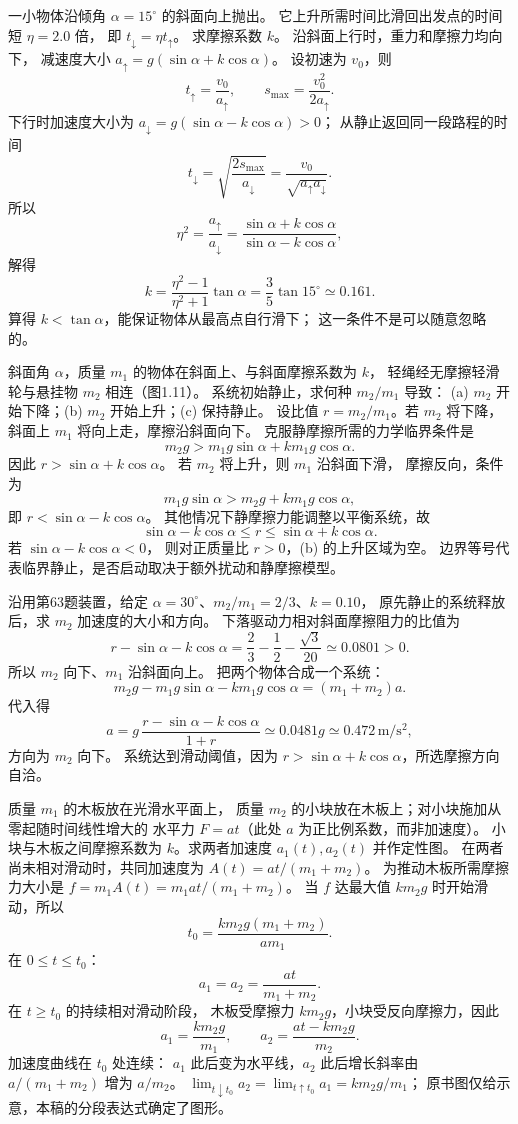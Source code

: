 一小物体沿倾角 $\alpha=15^\circ$ 的斜面向上抛出。
它上升所需时间比滑回出发点的时间短 $\eta=2.0$ 倍，
即 $t_{\downarrow}=\eta t_{\uparrow}$。
求摩擦系数 $k$。
\exsolution
沿斜面上行时，重力和摩擦力均向下，
减速度大小
$a_\uparrow=g(\sin\alpha+k\cos\alpha)$。
设初速为 $v_0$，则
\[
 t_\uparrow=\frac{v_0}{a_\uparrow},\qquad
 s_{\max}=\frac{v_0^2}{2a_\uparrow}.
\]
下行时加速度大小为
$a_\downarrow=g(\sin\alpha-k\cos\alpha)>0$；
从静止返回同一段路程的时间
\[
 t_\downarrow=\sqrt{\frac{2s_{\max}}{a_\downarrow}}
 =\frac{v_0}{\sqrt{a_\uparrow a_\downarrow}}.
\]
所以
\[
 \eta^2=\frac{a_\uparrow}{a_\downarrow}
 =\frac{\sin\alpha+k\cos\alpha}
 {\sin\alpha-k\cos\alpha},
\]
解得
\[
 \boxed{k=\frac{\eta^2-1}{\eta^2+1}\tan\alpha
 =\frac35\tan15^\circ\simeq0.161.}
\]
\excheck 算得 $k<\tan\alpha$，能保证物体从最高点自行滑下；
这一条件不是可以随意忽略的。

斜面角 $\alpha$，质量 $m_1$ 的物体在斜面上、与斜面摩擦系数为 $k$，
轻绳经无摩擦轻滑轮与悬挂物 $m_2$ 相连（图1.11）。
系统初始静止，求何种 $m_2/m_1$ 导致：
(a) $m_2$ 开始下降；(b) $m_2$ 开始上升；(c) 保持静止。
\exsolution
设比值 $r=m_2/m_1$。若 $m_2$ 将下降，
斜面上 $m_1$ 将向上走，摩擦沿斜面向下。
克服静摩擦所需的力学临界条件是
\[
 m_2g>m_1g\sin\alpha+km_1g\cos\alpha.
\]
因此
$\boxed{r>\sin\alpha+k\cos\alpha}$。
若 $m_2$ 将上升，则 $m_1$ 沿斜面下滑，
摩擦反向，条件为
\[
 m_1g\sin\alpha>m_2g+km_1g\cos\alpha,
\]
即 $\boxed{r<\sin\alpha-k\cos\alpha}$。
其他情况下静摩擦力能调整以平衡系统，故
\[
 \boxed{\sin\alpha-k\cos\alpha
 \le r\le \sin\alpha+k\cos\alpha.}
\]
\excheck 若 $\sin\alpha-k\cos\alpha<0$，
则对正质量比 $r>0$，(b) 的上升区域为空。
边界等号代表临界静止，是否启动取决于额外扰动和静摩擦模型。

沿用第63题装置，给定
$\alpha=30^\circ$、$m_2/m_1=2/3$、$k=0.10$，
原先静止的系统释放后，求 $m_2$ 加速度的大小和方向。
\exsolution
下落驱动力相对斜面摩擦阻力的比值为
\[
 r-\sin\alpha-k\cos\alpha
 =\frac23-\frac12-\frac{\sqrt3}{20}
 \simeq0.0801>0.
\]
所以 $m_2$ 向下、$m_1$ 沿斜面向上。
把两个物体合成一个系统：
\[
 m_2g-m_1g\sin\alpha-km_1g\cos\alpha
 =(m_1+m_2)a.
\]
代入得
\[
 \boxed{a=g\,\frac{r-\sin\alpha-k\cos\alpha}{1+r}
 \simeq0.0481g\simeq0.472\,\mathrm{m/s^2},}
\]
方向为 $m_2$ 向下。
\excheck 系统达到滑动阈值，因为
$r>\sin\alpha+k\cos\alpha$，所选摩擦方向自洽。

质量 $m_1$ 的木板放在光滑水平面上，
质量 $m_2$ 的小块放在木板上；对小块施加从零起随时间线性增大的
水平力 $F=at$（此处 $a$ 为正比例系数，而非加速度）。
小块与木板之间摩擦系数为 $k$。求两者加速度
$a_1(t),a_2(t)$ 并作定性图。
\exsolution
在两者尚未相对滑动时，共同加速度为
$A(t)=at/(m_1+m_2)$。
为推动木板所需摩擦力大小是
$f=m_1A(t)=m_1at/(m_1+m_2)$。
当 $f$ 达最大值 $km_2g$ 时开始滑动，所以
\[
 \boxed{t_0=\frac{km_2g(m_1+m_2)}{am_1}.}
\]
在 $0\le t\le t_0$：
\[
 \boxed{a_1=a_2=\frac{at}{m_1+m_2}.}
\]
在 $t\ge t_0$ 的持续相对滑动阶段，
木板受摩擦力 $km_2g$，小块受反向摩擦力，因此
\[
 \boxed{a_1=\frac{km_2g}{m_1},\qquad
 a_2=\frac{at-km_2g}{m_2}.}
\]
加速度曲线在 $t_0$ 处连续：
$a_1$ 此后变为水平线，$a_2$ 此后增长斜率由
$a/(m_1+m_2)$ 增为 $a/m_2$。
\excheck $\lim_{t\downarrow t_0}a_2
=\lim_{t\uparrow t_0}a_1=km_2g/m_1$；
原书图仅给示意，本稿的分段表达式确定了图形。

